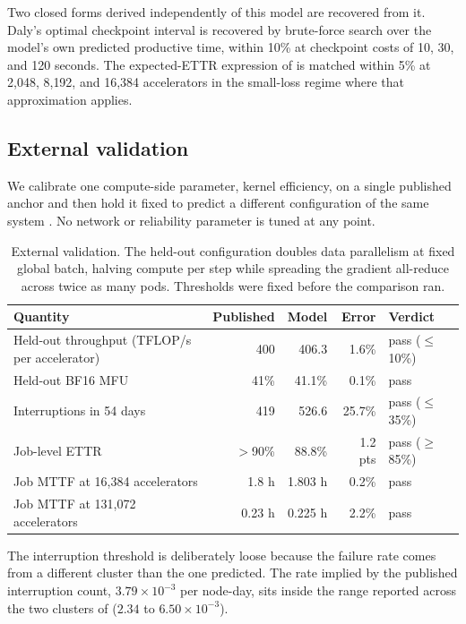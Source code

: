 \documentclass[11pt]{article}
\begin{document}
Two closed forms derived independently of this model are recovered from it.
Daly's optimal checkpoint interval \citep{daly2006checkpoint} is recovered by
brute-force search over the model's own predicted productive time, within 10\%
at checkpoint costs of 10, 30, and 120 seconds. The expected-ETTR expression of
\citet{kokolis2025reliability} is matched within 5\% at 2{,}048, 8{,}192, and
16{,}384 accelerators in the small-loss regime where that approximation applies.

\subsection{External validation}

We calibrate one compute-side parameter, kernel efficiency, on a single
published anchor and then hold it fixed to predict a different configuration of
the same system \citep{grattafiori2024llama3}. No network or reliability
parameter is tuned at any point.

\begin{table}[t]
\centering
\small
\begin{tabular}{lrrrl}
\toprule
Quantity & Published & Model & Error & Verdict \\
\midrule
Held-out throughput (TFLOP/s per accelerator) & 400 & 406.3 & 1.6\% & pass ($\le$10\%) \\
Held-out BF16 MFU & 41\% & 41.1\% & 0.1\% & pass \\
Interruptions in 54 days & 419 & 526.6 & 25.7\% & pass ($\le$35\%) \\
Job-level ETTR & $>$90\% & 88.8\% & 1.2 pts & pass ($\ge$85\%) \\
Job MTTF at 16{,}384 accelerators & 1.8 h & 1.803 h & 0.2\% & pass \\
Job MTTF at 131{,}072 accelerators & 0.23 h & 0.225 h & 2.2\% & pass \\
\bottomrule
\end{tabular}
\caption{External validation. The held-out configuration doubles data
parallelism at fixed global batch, halving compute per step while spreading the
gradient all-reduce across twice as many pods. Thresholds were fixed before the
comparison ran.}
\label{tab:validation}
\end{table}

The interruption threshold is deliberately loose because the failure rate comes
from a different cluster than the one predicted. The rate implied by the
published interruption count, $3.79 \times 10^{-3}$ per node-day, sits inside the
range reported across the two clusters of \citet{kokolis2025reliability}
($2.34$ to $6.50 \times 10^{-3}$).
\end{document}
